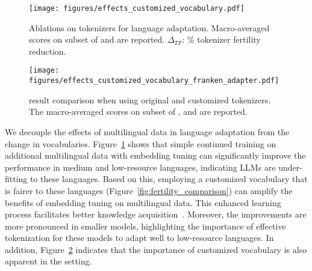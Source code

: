 \begin{figure}[t]
    \setlength{\abovecaptionskip}{-0.0001cm}
    \setlength{\belowcaptionskip}{-0.35cm}
    \centering
    \texttt{[image: figures/effects\_customized\_vocabulary.pdf]}
    \vspace{-8mm}
    \caption{Ablations on tokenizers for language adaptation. Macro-averaged scores on \sea subset of \flores and \belebele are reported. $\Delta_{TF}$: \% tokenizer fertility reduction.}
    \vspace{-6mm}
    \label{fig:effects_customized_vocabulary}
\end{figure}

\begin{figure}[t]
    \setlength{\abovecaptionskip}{-0.0001cm}
    \setlength{\belowcaptionskip}{-0.35cm}
    \centering
    \texttt{[image: figures/effects\_customized\_vocabulary\_franken\_adapter.pdf]}
    \vspace{-9.5mm}
    \caption{\ouradapter result comparison when using original and customized tokenizers. The macro-averaged scores on \sea subset of \belebele, \sib and \flores are reported. }
    \vspace{-4mm}
    \label{fig:effects_customized_vocabulary_franken_adapter}
\end{figure}

We decouple the effects of multilingual data in language adaptation from the change in vocabularies.
Figure~\ref{fig:effects_customized_vocabulary} shows that simple continued training on additional multilingual data with embedding tuning can significantly improve the performance in medium and low-resource languages, indicating LLMs are under-fitting to these languages. Based on this, employing a customized vocabulary that is fairer to these languages (Figure~\ref{fig:fertility_comparison}) can amplify the benefits of embedding tuning on multilingual data. This enhanced learning process facilitates better knowledge acquisition~\citep{zhang-etal-2022-robust,hofmann-etal-2022-embarrassingly}. Moreover, the improvements are more pronounced in smaller models, highlighting the importance of effective tokenization for these models to adapt well to low-resource languages. 
In addition, Figure~\ref{fig:effects_customized_vocabulary_franken_adapter} indicates that the importance of customized vocabulary is also apparent in the \ouradapter setting.

